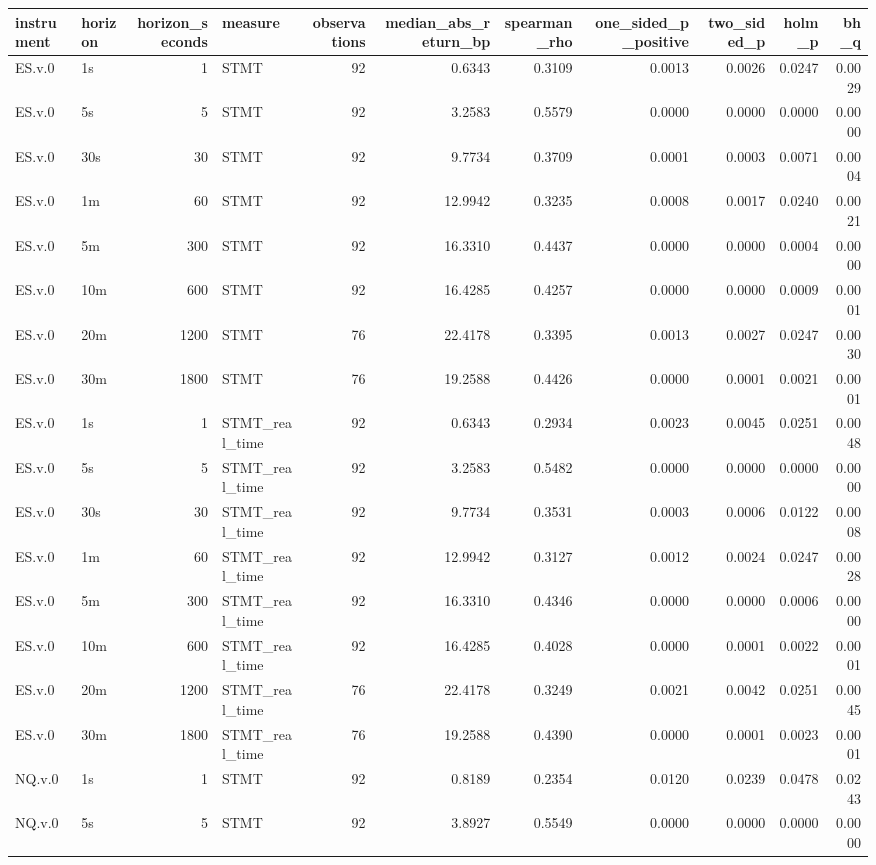 \begin{tabular}{llrlrrrrrrr}
\toprule
instrument & horizon & horizon_seconds & measure & observations & median_abs_return_bp & spearman_rho & one_sided_p_positive & two_sided_p & holm_p & bh_q \\
\midrule
ES.v.0 & 1s & 1 & STMT & 92 & 0.6343 & 0.3109 & 0.0013 & 0.0026 & 0.0247 & 0.0029 \\
ES.v.0 & 5s & 5 & STMT & 92 & 3.2583 & 0.5579 & 0.0000 & 0.0000 & 0.0000 & 0.0000 \\
ES.v.0 & 30s & 30 & STMT & 92 & 9.7734 & 0.3709 & 0.0001 & 0.0003 & 0.0071 & 0.0004 \\
ES.v.0 & 1m & 60 & STMT & 92 & 12.9942 & 0.3235 & 0.0008 & 0.0017 & 0.0240 & 0.0021 \\
ES.v.0 & 5m & 300 & STMT & 92 & 16.3310 & 0.4437 & 0.0000 & 0.0000 & 0.0004 & 0.0000 \\
ES.v.0 & 10m & 600 & STMT & 92 & 16.4285 & 0.4257 & 0.0000 & 0.0000 & 0.0009 & 0.0001 \\
ES.v.0 & 20m & 1200 & STMT & 76 & 22.4178 & 0.3395 & 0.0013 & 0.0027 & 0.0247 & 0.0030 \\
ES.v.0 & 30m & 1800 & STMT & 76 & 19.2588 & 0.4426 & 0.0000 & 0.0001 & 0.0021 & 0.0001 \\
ES.v.0 & 1s & 1 & STMT_real_time & 92 & 0.6343 & 0.2934 & 0.0023 & 0.0045 & 0.0251 & 0.0048 \\
ES.v.0 & 5s & 5 & STMT_real_time & 92 & 3.2583 & 0.5482 & 0.0000 & 0.0000 & 0.0000 & 0.0000 \\
ES.v.0 & 30s & 30 & STMT_real_time & 92 & 9.7734 & 0.3531 & 0.0003 & 0.0006 & 0.0122 & 0.0008 \\
ES.v.0 & 1m & 60 & STMT_real_time & 92 & 12.9942 & 0.3127 & 0.0012 & 0.0024 & 0.0247 & 0.0028 \\
ES.v.0 & 5m & 300 & STMT_real_time & 92 & 16.3310 & 0.4346 & 0.0000 & 0.0000 & 0.0006 & 0.0000 \\
ES.v.0 & 10m & 600 & STMT_real_time & 92 & 16.4285 & 0.4028 & 0.0000 & 0.0001 & 0.0022 & 0.0001 \\
ES.v.0 & 20m & 1200 & STMT_real_time & 76 & 22.4178 & 0.3249 & 0.0021 & 0.0042 & 0.0251 & 0.0045 \\
ES.v.0 & 30m & 1800 & STMT_real_time & 76 & 19.2588 & 0.4390 & 0.0000 & 0.0001 & 0.0023 & 0.0001 \\
NQ.v.0 & 1s & 1 & STMT & 92 & 0.8189 & 0.2354 & 0.0120 & 0.0239 & 0.0478 & 0.0243 \\
NQ.v.0 & 5s & 5 & STMT & 92 & 3.8927 & 0.5549 & 0.0000 & 0.0000 & 0.0000 & 0.0000 \\

\end{tabular}
